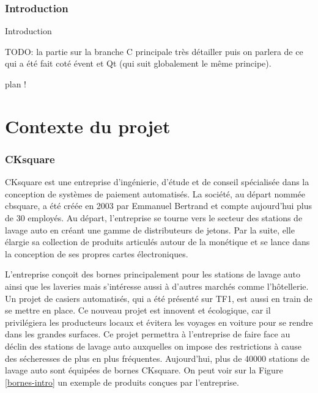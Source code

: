 \documentclass[a4paper]{article}
\begin{document}
\clearpage{}

\pagestyle{plain}
\setcounter{page}{1}
\clearpage
\section*{Introduction}

Introduction

TODO: la partie sur la branche C principale très détailler puis on parlera de ce
qui a été fait coté évent et Qt (qui suit globalement le même principe).

plan !

\clearpage{}



\part{Contexte du projet}

\section{CKsquare}%

CKsquare est une entreprise d'ingénierie, d'étude et de conseil spécialisée dans
la conception de systèmes de paiement automatisés. La société, au départ nommée
cbsquare, a été créée en 2003 par Emmanuel Bertrand et compte aujourd'hui plus
de 30 employés. Au départ, l'entreprise se tourne vers le secteur des stations
de lavage auto en créant une gamme de distributeurs de jetons. Par la suite,
elle élargie sa collection de produits articulés autour de la monétique et se
lance dans la conception de ses propres cartes électroniques.

L'entreprise conçoit des bornes principalement pour les stations de lavage auto
ainsi que les laveries mais s'intéresse aussi à d'autres marchés comme
l'hôtellerie. Un projet de casiers automatisés, qui a été présenté sur TF1, est
aussi en train de se mettre en place. Ce nouveau projet est innovent et
écologique, car il privilégiera les producteurs locaux et évitera les voyages en
voiture pour se rendre dans les grandes surfaces. Ce projet permettra à
l'entreprise de faire face au déclin des stations de lavage auto auxquelles on
impose des restrictions à cause des sécheresses de plus en plus fréquentes.
Aujourd'hui, plus de 40000 stations de lavage auto sont équipées de bornes
CKsquare. On peut voir sur la Figure \ref{bornes-intro} un exemple de produits
conçues par l'entreprise.
\end{document}
